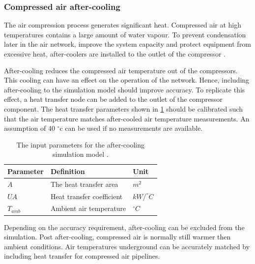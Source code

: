 		\subsubsection{Compressed air after-cooling}
		The air compression process generates significant heat. Compressed air at high temperatures contains a large amount of water vapour. To prevent condensation later in the air network, improve the system capacity and protect equipment from excessive heat, after-coolers are installed to the outlet of the compressor \cite{schroeder2009energy}.
		\par 
		After-cooling reduces the compressed air temperature out of the compressors. This cooling can have an effect on the operation of the network. Hence, including after-cooling to the simulation model should improve accuracy. 
		To replicate this effect, a heat transfer node can be added to the outlet of the compressor component. The heat transfer parameters shown in \cref{table: After cooling inputs} should be calibrated such that the air temperature matches after-cooled air temperature measurements. An assumption of 40 $^\circ$\gls{c} can be used if no measurements are available.
		\par
		\begin{table}
			\centering
			\begin{tabular}{lll}
				\hline 
				Parameter \hspace{1cm} & Definition \hspace{4cm} & Unit \\
				\hline
				$A$ & The heat transfer area & $m^2$ \\
				$UA$ & Heat transfer coefficient & $kW/^{\circ} C$ \\
				$T_{amb}$ & Ambient air temperature & $^{\circ} C$ \\
				\hline
			\end{tabular}
		\caption{The input parameters for the after-cooling simulation model .}
		\label{table: After cooling inputs}
		\end{table}
	Depending on the accuracy requirement, after-cooling can be excluded from the simulation. Post after-cooling, compressed air is normally still warmer then ambient conditions. Air temperatures underground can be accurately matched by including heat transfer for compressed air pipelines.
